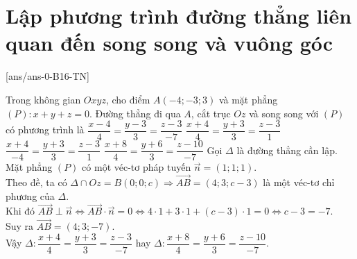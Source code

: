 \section{Lập phương trình đường thẳng liên quan đến song song và vuông góc}
\TN
{}[ans/ans-0-B16-TN]
\setcounter{ex}{0}
\begin{ex}%
	Trong không gian $Oxyz$, cho điểm $A(-4;-3;3)$ và mặt phẳng $(P)\colon x+y+z=0$. Đường thẳng đi qua $A$, cắt trục $Oz$ và song song với $(P)$ có phương trình là
	\choice
	{$\dfrac{x-4}{4}=\dfrac{y-3}{3}=\dfrac{z-3}{-7}$}
	{$\dfrac{x+4}{4}=\dfrac{y+3}{3}=\dfrac{z-3}{1}$}
	{$\dfrac{x+4}{-4}=\dfrac{y+3}{3}=\dfrac{z-3}{1}$}
	{\True $\dfrac{x+8}{4}=\dfrac{y+6}{3}=\dfrac{z-10}{-7}$}
	\loigiai
	{
		Gọi $\Delta$ là đường thẳng cần lập.\\
		Mặt phẳng $(P)$ có một véc-tơ pháp tuyến $\vec{n}=(1;1;1)$.\\
		Theo đề, ta có $\Delta\cap Oz=B(0;0;c) \Rightarrow \overrightarrow{AB}=(4;3;c-3)$ là một véc-tơ chỉ phương của $\Delta$.\\
		Khi đó $\overrightarrow{AB}\perp\vec{n}\Leftrightarrow\overrightarrow{AB}\cdot\vec{n}=0\Leftrightarrow4\cdot1+3\cdot1+(c-3)\cdot1=0\Leftrightarrow c-3=-7$.\\
		Suy ra $\overrightarrow{AB}=(4;3;-7)$.\\
		Vậy $\Delta\colon \dfrac{x+4}{4}=\dfrac{y+3}{3}=\dfrac{z-3}{-7}$ hay $\Delta\colon \dfrac{x+8}{4}=\dfrac{y+6}{3}=\dfrac{z-10}{-7}$.
	}
\end{ex}
